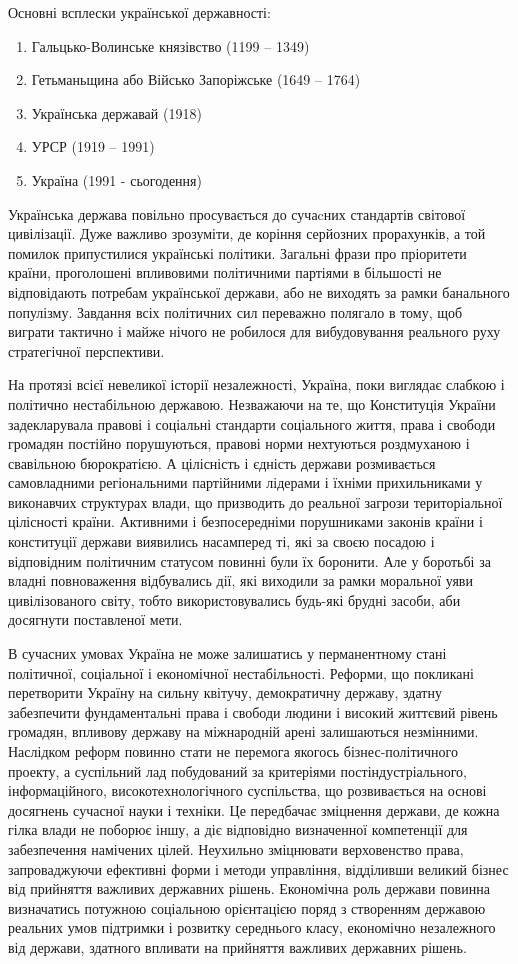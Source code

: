 Основні всплески української державності:
\begin{enumerate}
\item Гальцько-Волинське князівство (1199 – 1349)
\item Гетьманьщина або Військо Запоріжське (1649 – 1764)
\item Українська державай (1918)
\item УРСР (1919 – 1991)
\item Україна (1991 - сьогодення)
\end{enumerate}
Українська держава повільно просувається до сучаcних стандартів світової цивілізації. Дуже важливо зрозуміти, де коріння серйозних прорахунків, а той помилок припустилися українські політики. Загальні фрази про пріоритети країни, проголошені впливовими політичними партіями в більшості не відповідають потребам української держави, або не виходять за рамки банального популізму. Завдання всіх політичних сил переважно полягало в тому, щоб виграти тактично і майже нічого не робилося для вибудовування реального руху стратегічної перспективи.

На протязі всієї невеликої історії незалежності, Україна, поки виглядає слабкою і політично нестабільною державою. Незважаючи на те, що Конституція України задекларувала правові і соціальні стандарти соціального життя, права і свободи громадян постійно порушуються, правові норми нехтуються роздмуханою і свавільною бюрократією. А цілісність і єдність держави розмивається самовладними  регіональними партійними лідерами і їхніми прихильниками у виконавчих структурах влади, що призводить до реальної загрози територіальної цілісності країни. Активними і безпосередніми порушниками законів країни і конституції держави виявились насамперед ті, які за своєю посадою і відповідним політичним статусом повинні були їх боронити. Але у боротьбі за владні повноваження  відбувались дії, які виходили за рамки моральної уяви цивілізованого світу, тобто використовувались будь-які брудні засоби, аби досягнути поставленої мети.

В сучасних умовах Україна не може залишатись у перманентному стані політичної, соціальної і економічної нестабільності. Реформи, що покликані перетворити Україну на сильну квітучу, демократичну державу, здатну забезпечити фундаментальні права і свободи людини і високий життєвий рівень громадян, впливову державу на міжнародній арені залишаються незмінними. Наслідком реформ повинно стати не перемога якогось бізнес-політичного проекту, а суспільний лад побудований за критеріями постіндустріального, інформаційного, високотехнологічного суспільства, що розвивається на основі досягнень сучасної науки і техніки.  Це передбачає зміцнення держави, де кожна гілка влади не поборює іншу, а діє  відповідно визначенної компетенції для забезпечення намічених цілей. Неухильно зміцнювати верховенство права, запроваджуючи ефективні форми і методи управління, відділивши великий бізнес від прийняття важливих державних рішень. Економічна роль держави повинна визначатись потужною соціальною орієнтацією поряд з створенням державою реальних умов підтримки і розвитку середнього класу, економічно незалежного від держави, здатного впливати на прийняття важливих державних рішень.

